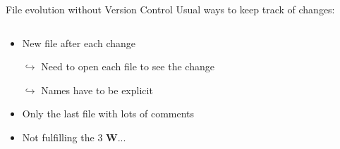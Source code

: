 \documentclass[xcolor=x11names,compress]{beamer}
\renewcommand{\(}{\begin{columns}}
\renewcommand{\)}{\end{columns}}
\newcommand{\<}[1]{\begin{column}{#1}}
\renewcommand{\>}{\end{column}}
\begin{document}
\begin{frame}{File evolution  \textcolor{brique}{without Version Control}  }
Usual ways to keep track of changes:
\pause
\begin{columns}[t]
\begin{column}{0.6\textwidth}
\begin{itemize}[<+->]
        \item New file after each change
        \item[$\hookrightarrow$] Need to open each file to see the change
        \item[$\hookrightarrow$] Names have to be explicit
        \item Only the last file with lots of comments
        \item Not fulfilling the 3 \textcolor{siap}{\textbf{W}}...


\end{itemize}
\end{column}
\end{columns}
\end{frame}
\end{document}
